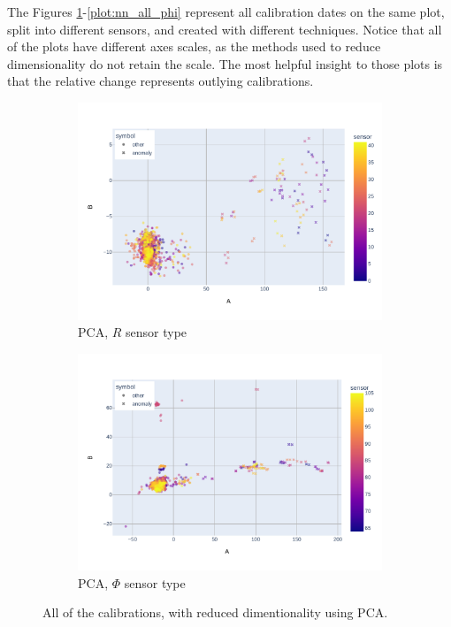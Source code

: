   The Figures \ref{plot:pca_all_r}-\ref{plot:nn_all_phi} represent all calibration dates on the same plot, split into different sensors, and created with different techniques. Notice that all of the plots have different axes scales, as the methods used to reduce dimensionality do not retain the scale. The most helpful insight to those plots is that the relative change represents outlying calibrations.

\begin{figure}
\centering
\begin{subfigure}[b]{0.9\textwidth}
    \centering
    \includegraphics[width=\linewidth]{figures/chapter4/dimred/PCA_module_R_all.pdf}
\caption{PCA, $R$ sensor type}
   \label{plot:pca_all_r}
  \end{subfigure}
\begin{subfigure}[b]{0.9\textwidth}
    \centering
    \includegraphics[width=\linewidth]{figures/chapter4/dimred/PCA_module_phi_all.pdf}
\caption{PCA, $\Phi$ sensor type}
   \label{plot:pca_all_phi}
  \end{subfigure}

    \caption[All calibrationa]{All of the calibrations, with reduced dimentionality using PCA.}
\end{figure}

